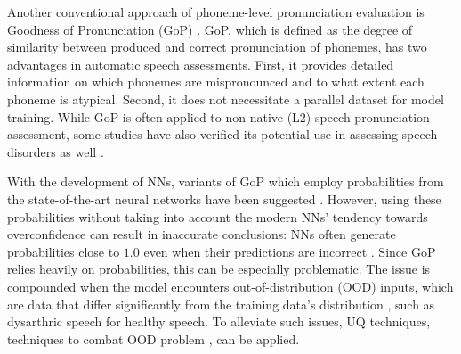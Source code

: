 

Another conventional approach of phoneme-level pronunciation evaluation is Goodness of Pronunciation (GoP) \cite{witt2000phone}.
GoP, which is defined as the degree of similarity between produced and correct pronunciation of phonemes, has two advantages in automatic speech assessments.
First, it provides detailed information on which phonemes are mispronounced and to what extent each phoneme is atypical.
Second, it does not necessitate a parallel dataset for model training.
While GoP is often applied to non-native (L2) speech pronunciation assessment, some studies have also verified its potential use in assessing speech disorders as well \cite{pellegrini2014goodness,Fontan2015PredictingDS}.


With the development of NNs, variants of GoP which employ probabilities from the state-of-the-art neural networks have been suggested \cite{hu2015improved,Cheng2020ASRFreePA,xu2021explore}.
However, using these probabilities without taking into account the modern NNs' tendency towards overconfidence can result in inaccurate conclusions:
NNs often generate probabilities close to $1.0$ even when their predictions are incorrect \cite{guo2017calibration}.
Since GoP relies heavily on probabilities, this can be especially problematic. The issue is compounded when the model encounters out-of-distribution (OOD) inputs, which are data that differ significantly from the training data's distribution \cite{hendrycks2017baseline}, such as dysarthric speech for healthy speech.
To alleviate such issues, UQ techniques, techniques to combat OOD problem \cite{guo2017calibration,hendrycks2017baseline}, can be applied.



